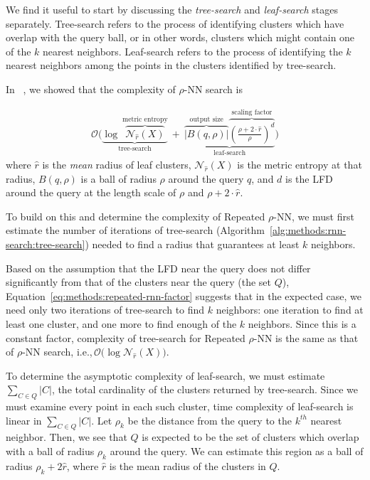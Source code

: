 We find it useful to start by discussing the \textit{tree-search} and \textit{leaf-search} stages separately.
Tree-search refers to the process of identifying clusters which have overlap with the query ball, or in other words, clusters which might contain one of the $k$ nearest neighbors.
Leaf-search refers to the process of identifying the $k$ nearest neighbors among the points in the clusters identified by tree-search.

In ~\cite{ishaq2019clustered}, we showed that the complexity of $\rho$-NN search is

\begin{gather}
    \mathcal{O}
    \Bigg(
        \underbrace{
            \log~\overbrace{\mathcal{N}_{\hat{r}}(X)}^{\textrm{metric entropy}}
        }_{\textrm{tree-search}}
        \ + \
        \underbrace{
            \overbrace{ \big| B(q, \rho) \big|}^{\textrm{output size}}
            \overbrace{ \left( \frac{\rho + 2 \cdot \hat{r}}{ \rho} \right) ^ d}^{\textrm{scaling factor}}
        }_{\textrm{leaf-search}}
    \Bigg)
    \label{eq:methods:rnn-search-complexity}
\end{gather}
where $\hat{r}$ is the \textit{mean} radius of leaf clusters, $\mathcal{N}_{\hat{r}}(X)$ is the metric entropy at that radius, $B(q, \rho)$ is a ball of radius $\rho$ around the query $q$, and $d$ is the LFD around the query at the length scale of $\rho$ and $\rho + 2 \cdot \hat{r}$.

To build on this and determine the complexity of Repeated $\rho$-NN, we must first estimate the number of iterations of tree-search (Algorithm~\ref{alg:methods:rnn-search:tree-search}) needed to find a radius that guarantees at least $k$ neighbors.

Based on the assumption that the LFD near the query does not differ significantly from that of the clusters near the query (the set $Q$), Equation~\ref{eq:methods:repeated-rnn-factor} suggests that in the expected case, we need only two iterations of tree-search to find $k$ neighbors:
one iteration to find at least one cluster, and one more to find enough of the $k$ neighbors.
Since this is a constant factor, complexity of tree-search for Repeated $\rho$-NN is the same as that of $\rho$-NN search, i.e.,\,$\mathcal{O}\big(\log\mathcal{N}_{\hat{r}}(X)\big)$.

To determine the asymptotic complexity of leaf-search, we must estimate $\sum_{C \in Q} |C|$, the total cardinality of the clusters returned by tree-search.
Since we must examine every point in each such cluster, time complexity of leaf-search is linear in $\sum_{C \in Q} |C|$.
Let $\rho_k$ be the distance from the query to the $k^{th}$ nearest neighbor.
Then, we see that $Q$ is expected to be the set of clusters which overlap with a ball of radius $\rho_k$ around the query.
We can estimate this region as a ball of radius $\rho_k + 2\hat{r}$, where $\hat{r}$ is the mean radius of the clusters in $Q$.

